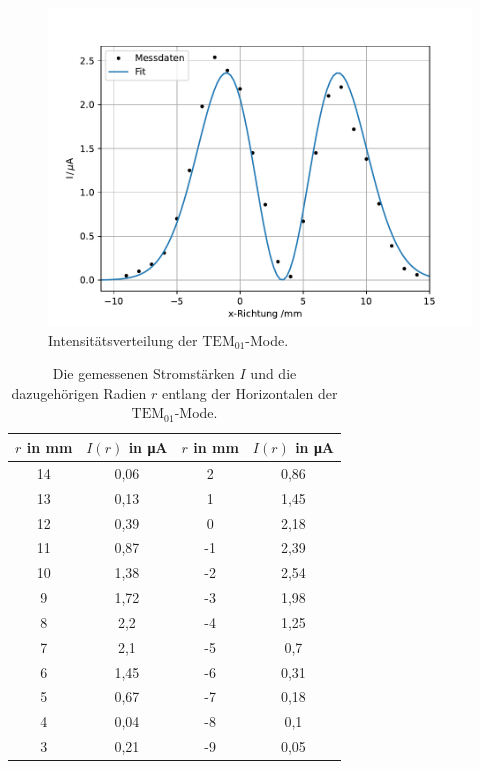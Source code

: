 \begin{figure}[h!]
  \centering
  \includegraphics[scale=0.7]{fig/plot3.pdf}
  \caption{Intensitätsverteilung der $\mathrm{TEM}_\mathrm{01}$-Mode.}
  \label{fig:T01}
\end{figure}

\begin{table}
 \centering
 \caption{Die gemessenen Stromstärken $I$ und die dazugehörigen Radien $r$ entlang der Horizontalen der $\mathrm{TEM}_\mathrm{01}$-Mode.}
 \label{tab:T01}
 \begin{tabular}{c c c c}
   \toprule
   $r$ in mm & $I(r)$ in \si{\micro\ampere} & $r$ in mm & $I(r)$ in \si{\micro\ampere} \\
   \midrule
   14 & 0,06 & 2  & 0,86 \\
   13 & 0,13 & 1  & 1,45 \\
   12 & 0,39 & 0  & 2,18 \\
   11 & 0,87 & -1 & 2,39 \\
   10 & 1,38 & -2 & 2,54 \\
   9  & 1,72 & -3 & 1,98 \\
   8  & 2,2  & -4 & 1,25 \\
   7  & 2,1  & -5 & 0,7  \\
   6  & 1,45 & -6 & 0,31 \\
   5  & 0,67 & -7 & 0,18 \\
   4  & 0,04 & -8 & 0,1  \\
   3  & 0,21 & -9 & 0,05 \\
   \bottomrule
 \end{tabular}
\end{table}
\FloatBarrier
